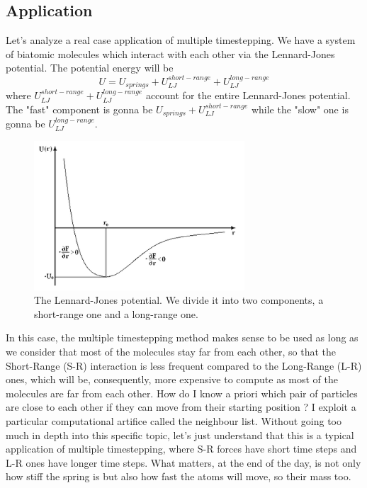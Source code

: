 \subsection{Application}
Let's analyze a real case application of multiple timestepping. We have a system of biatomic molecules which interact with each other via the Lennard-Jones potential. The potential energy will be 
\begin{equation}
    U = U_{springs} + U_{LJ}^{short-range} + U_{LJ}^{long-range}
\end{equation}
where $U_{LJ}^{short-range} + U_{LJ}^{long-range}$ account for the entire Lennard-Jones potential. The "fast" component is gonna be $U_{springs} + U_{LJ}^{short-range}$ while the "slow" one is gonna be $U_{LJ}^{long-range}$.
\begin{figure}[h]
    \centering
    \includegraphics[width=0.70\textwidth]{Integrators/images/Lennard-Jones.png}
    \caption{The Lennard-Jones potential. We divide it into two components, a short-range one and a long-range one.}
    \label{Lennard-Jones}
\end{figure}
In this case, the multiple timestepping method makes sense to be used as long as we consider that most of the molecules stay far from each other, so that the Short-Range (S-R) interaction is less frequent compared to the Long-Range (L-R) ones, which will be, consequently, more expensive to compute as most of the molecules are far from each other. How do I know a priori which pair of particles are close to each other if they can move from their starting position ? I exploit a particular computational artifice called the neighbour list. Without going too much in depth into this specific topic, let's just understand that this is a typical application of multiple timestepping, where S-R forces have short time steps and L-R ones have longer time steps. What matters, at the end of the day, is not only how stiff the spring is but also how fast the atoms will move, so their mass too.\\
